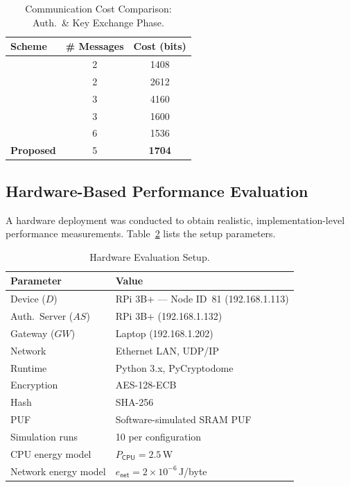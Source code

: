 \documentclass[conference]{IEEEtran}
\begin{document}
\begin{table}[!t]
  \centering
  \caption{Communication Cost Comparison: Auth.\ \& Key Exchange Phase.}
  \label{tab:comm_auth}
  \scriptsize
  \setlength{\tabcolsep}{3pt}
  \begin{tabular}{lcc}
    \toprule
    Scheme & \# Messages & Cost (bits) \\
    \midrule
    \cite{alruwaili2025raaf} & 2 & 1408 \\
    \cite{yang2024sakms}     & 2 & 2612 \\
    \cite{li2020puf}         & 3 & 4160 \\
    \cite{zheng2022puf}      & 3 & 1600 \\
    \cite{rosa2023lightsae}  & 6 & 1536 \\
    \textbf{Proposed}        & 5 & \textbf{1704} \\
    \bottomrule
  \end{tabular}
\end{table}

\subsection{Hardware-Based Performance Evaluation}
\label{sec:hw}

A hardware deployment was conducted to obtain realistic, implementation-level
performance measurements.  Table~\ref{tab:hwsetup} lists the setup
parameters.

\begin{table}[!t]
  \centering
  \caption{Hardware Evaluation Setup.}
  \label{tab:hwsetup}
  \scriptsize
  \setlength{\tabcolsep}{4pt}
  \begin{tabular}{ll}
    \toprule
    Parameter & Value \\
    \midrule
    Device ($D$)          & RPi 3B+ — Node ID~81 (192.168.1.113) \\
    Auth.\ Server ($AS$)  & RPi 3B+ (192.168.1.132) \\
    Gateway ($GW$)        & Laptop (192.168.1.202) \\
    Network               & Ethernet LAN, UDP/IP \\
    Runtime               & Python 3.x, PyCryptodome \\
    Encryption            & AES-128-ECB \\
    Hash                  & SHA-256 \\
    PUF                   & Software-simulated SRAM PUF \\
    Simulation runs       & 10 per configuration \\
    CPU energy model      & $P_\mathsf{CPU} = 2.5$\,W \\
    Network energy model  & $e_\mathsf{net} = 2\times10^{-6}$\,J/byte \\
    \bottomrule
  \end{tabular}
\end{table}
\end{document}
